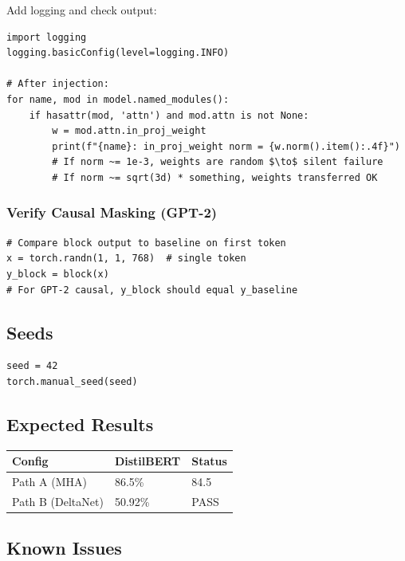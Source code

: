 Add logging and check output:

\begin{lstlisting}
import logging
logging.basicConfig(level=logging.INFO)

# After injection:
for name, mod in model.named_modules():
    if hasattr(mod, 'attn') and mod.attn is not None:
        w = mod.attn.in_proj_weight
        print(f"{name}: in_proj_weight norm = {w.norm().item():.4f}")
        # If norm ~= 1e-3, weights are random $\to$ silent failure
        # If norm ~= sqrt(3d) * something, weights transferred OK
\end{lstlisting}

\subsubsection{Verify Causal Masking (GPT-2)}

\begin{lstlisting}
# Compare block output to baseline on first token
x = torch.randn(1, 1, 768)  # single token
y_block = block(x)
# For GPT-2 causal, y_block should equal y_baseline
\end{lstlisting}

\subsection{Seeds}

\begin{lstlisting}
seed = 42
torch.manual_seed(seed)
\end{lstlisting}

\subsection{Expected Results}

\begin{table}[H]
\centering
\small
\begin{tabular}{lll}
\toprule
\textbf{Config} & \textbf{DistilBERT} & \textbf{Status} \\
\midrule
Path A (MHA) & 86.5\% & 84.5 \\
Path B (DeltaNet) & 50.92\% & PASS \\
\bottomrule
\end{tabular}
\end{table}

\subsection{Known Issues}

